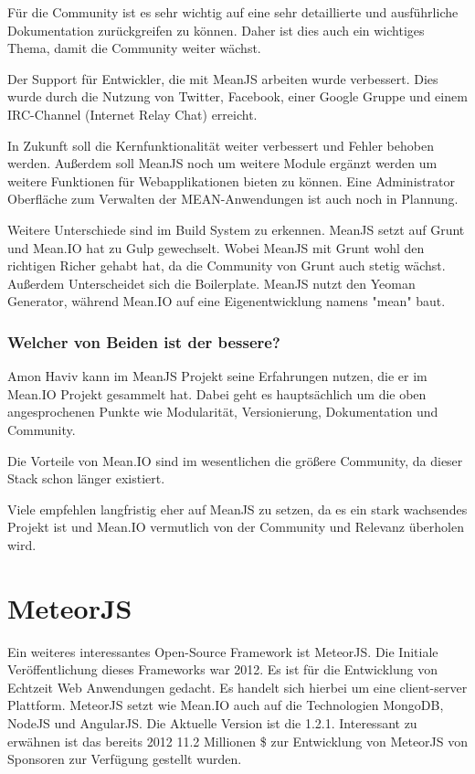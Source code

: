 Für die Community ist es sehr wichtig auf eine sehr detaillierte und ausführliche Dokumentation zurückgreifen zu können. Daher ist dies auch ein wichtiges Thema, damit die Community weiter wächst.

Der Support für Entwickler, die mit MeanJS arbeiten wurde verbessert. Dies wurde durch die Nutzung von Twitter, Facebook, einer Google Gruppe und einem IRC-Channel (Internet Relay Chat) erreicht.

In Zukunft soll die Kernfunktionalität weiter verbessert und Fehler behoben werden. Außerdem soll MeanJS noch um weitere Module ergänzt werden um weitere Funktionen für Webapplikationen bieten zu können. Eine Administrator Oberfläche zum Verwalten der MEAN-Anwendungen ist auch noch in Plannung.

\cite{meanJS:blog} \cite{meanJS:article}

Weitere Unterschiede sind im Build System zu erkennen. MeanJS setzt auf Grunt und Mean.IO hat zu Gulp gewechselt.
Wobei MeanJS mit Grunt wohl den richtigen Richer gehabt hat, da die Community von Grunt auch stetig wächst.
Außerdem Unterscheidet sich die Boilerplate. MeanJS nutzt den Yeoman Generator, während Mean.IO auf eine Eigenentwicklung namens "mean" baut.

\subsubsection{Welcher von Beiden ist der bessere?}

Amon Haviv kann im MeanJS Projekt seine Erfahrungen nutzen, die er im Mean.IO Projekt gesammelt hat.
Dabei geht es hauptsächlich um die oben angesprochenen Punkte wie Modularität, Versionierung, Dokumentation und Community.

Die Vorteile von Mean.IO sind im wesentlichen die größere Community, da dieser Stack schon länger existiert.

Viele empfehlen langfristig eher auf MeanJS zu setzen, da es ein stark wachsendes Projekt ist und Mean.IO vermutlich von der Community und Relevanz überholen wird. \cite{meanJS:article}

\section{MeteorJS}\label{meteor.js}

Ein weiteres interessantes Open-Source Framework ist MeteorJS. Die
Initiale Veröffentlichung dieses Frameworks war 2012. Es ist für die
Entwicklung von Echtzeit Web Anwendungen gedacht. Es handelt sich
hierbei um eine client-server Plattform. MeteorJS setzt wie Mean.IO auch auf die
Technologien MongoDB, NodeJS und AngularJS. Die Aktuelle Version ist
die 1.2.1. Interessant zu erwähnen ist das bereits 2012 11.2 Millionen
\$ zur Entwicklung von MeteorJS von Sponsoren zur Verfügung gestellt wurden.
	
